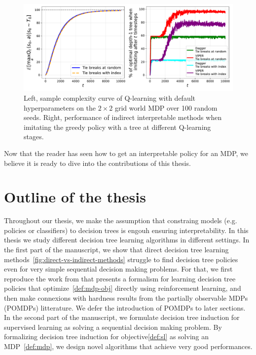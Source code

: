 \begin{figure}
    \centering
    \includegraphics[width=1\textwidth]{images/images_part1/base_mdp.pdf}
    \caption{Left, sample complexity curve of Q-learning with default hyperparameters on the $2\times 2$ grid world MDP over 100 random seeds. Right, performance of indirect interpretable methods when imitating the greedy policy with a tree at different Q-learning stages.}\label{fig:ql-il}
\end{figure}

Now that the reader has seen how to get an interpretable policy for an MDP, we believe it is ready to dive into the contributions of this thesis.

\section{Outline of the thesis}
Throughout our thesis, we make the assumption that constraing models (e.g. policies or classifiers) to decision trees is engouh ensuring interpretability.
In this thesis we study different decision tree learning algorithms in different settings. 
In the first part of the manuscript, we show that direct decision tree learning methods~\ref{fig:direct-vs-indirect-methods} struggle to find decision tree policies even for very simple sequential decision making problems.
For that, we first reproduce the work from\cite{topin2021iterative} that presents a formalism for learning decision tree policies that optimize~\ref{def:mdp-obj} directly using reinforcement learning, and then make connexions with hardness results from the partially observable MDPs (POMDPs)\cite{POMDP,chap2} litterature.
We defer the introduction of POMDPs to later sections.
In the second part of the manuscript, we formulate decision tree induction for supervised learning as solving a sequential decision making problem.
By formalizing decision tree induction for objective\ref{def:sl} as solving an MDP~\ref{def:mdp}, we design novel algorithms that achieve very good performances.


